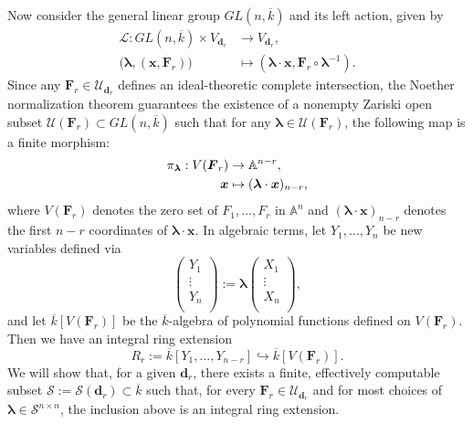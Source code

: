 \documentclass[pdflatex,sn-basic]{sn-jnl}%
\theoremstyle{thmstyleone}%
\theoremstyle{thmstyletwo}%
\theoremstyle{thmstylethree}%
\theoremstyle{definition}
\numberwithin{equation}{section}
\newcommand{\bfs}{\boldsymbol}
\newcommand{\A}{\mathbb A}
\begin{document}
Now consider the general linear group $GL(n,\overline{k})$ and its
left action, given by
%
\begin{align*}
  \mathcal{L}:GL(n,\overline{k})\times V_{\bfs d_r}&\to V_{\bfs d_r},\\
  \big(\bfs\lambda,(\bfs x,\bfs F_r)\big)&\mapsto (\bfs\lambda\cdot\bfs x, \bfs F_r\circ \bfs\lambda^{-1}).
\end{align*}
%
%
Since any $\bfs F_r\in\mathcal{U}_{\bfs d_r}$ defines an
ideal-theoretic complete intersection, the Noether normalization
theorem guarantees the existence of a nonempty Zariski open subset
$\mathcal{U}(\bfs F_r)\subset GL(n,\overline{k})$ such that for any
$\bfs\lambda\in\mathcal{U}(\bfs F_r)$, the following map is a finite
morphism:
%
\begin{align}
  \pi_{\bfs\lambda}:V(\bfs F_r)&\to \A^{n-r},\label{eq: Noether normalization}\\
  \bfs x&\mapsto (\bfs\lambda\cdot\bfs x)_{n-r},\notag
\end{align}
%
where $V(\bfs F_r)$ denotes the zero set of $F_1,\ldots,F_r$ in $\A^n$
and $(\bfs\lambda\cdot\bfs x)_{n-r}$ denotes the first $n-r$
coordinates of $\bfs\lambda\cdot\bfs x$. In algebraic terms, let
$Y_1,\ldots,Y_n$ be new variables defined via
%
$$\left(
    \begin{array}{c}
      Y_1 \\
      \vdots \\
      Y_n \\
    \end{array}
  \right):=\bfs\lambda
\left(
  \begin{array}{c}
    X_1 \\
    \vdots \\
    X_n \\
  \end{array}
\right),
$$
%
and let $\overline{k}[V(\bfs F_r)]$ be the $\overline{k}$-algebra of
polynomial functions defined on $V(\bfs F_r)$. Then we have an
integral ring extension
%
\begin{equation}\label{eq: integral ring extension}
R_r:=\overline{k}[Y_1,\ldots,Y_{n-r}]\hookrightarrow \overline{k}[V(\bfs
F_r)].
\end{equation}
%
We will show that, for a given $\bfs d_r$, there exists a finite,
effectively computable subset
$\mathcal{S}:=\mathcal{S}(\bfs d_r)\subset \overline{k}$
such that, for every
$\bfs F_r\in \mathcal{U}_{\bfs d_r}$ and for most choices of
$\bfs\lambda\in\mathcal{S}^{n\times n}$, the inclusion above
is an integral ring extension.
\end{document}
